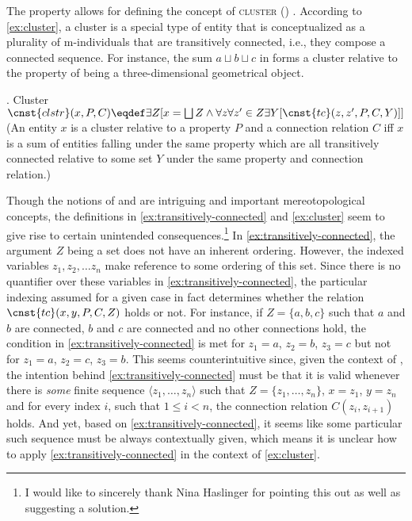 The property  allows for defining the concept of \textsc{cluster} () \citep[see][p. 144]{grimm2012degrees,grimm2012number}. According to \ref{ex:cluster}, a cluster is a special type of entity that is conceptualized as a plurality of m-individuals that are transitively connected, i.e., they compose a connected sequence. For instance, the sum $a\sqcup b\sqcup c$ in  forms a cluster relative to the property of being a three-dimensional geometrical object.

	\ex. Cluster \citep[p. 144; adapted]{grimm2012number}\\
	$\cnst{clstr}(x,P,C) \eqdef \exists Z[x = \bigsqcup Z \wedge \forall z \forall z' \in Z \exists Y[\cnst{tc}(z,z',P,C,Y)]]$\\
	(An entity $x$ is a cluster relative to a property $P$ and a connection relation $C$ iff $x$ is a sum of entities falling under the same property which are all transitively connected relative to some set $Y$ under the same property and connection relation.)\label{ex:cluster}

Though the notions of  and  are intriguing and important mereotopological concepts, the definitions in \ref{ex:transitively-connected} and \ref{ex:cluster} seem to give rise to certain unintended consequences.\footnote{I would like to sincerely thank Nina Haslinger for pointing this out as well as suggesting a solution.} In \ref{ex:transitively-connected}, the argument $Z$ being a set does not have an inherent ordering. However, the indexed variables $z_1,z_2,\dots z_n$ make reference to some ordering of this set. Since there is no quantifier over these variables in \ref{ex:transitively-connected}, the particular indexing assumed for a given case in fact determines whether the relation $\cnst{tc}(x,y,P,C,Z)$ holds or not. For instance, if $Z = \{a,b,c\}$ such that $a$ and $b$ are connected, $b$ and $c$ are connected and no other connections hold, the condition in \ref{ex:transitively-connected} is met for $z_1 = a$, $z_2 = b$, $z_3 = c$ but not for $z_1 = a$, $z_2 = c$, $z_3 = b$. This seems counterintuitive since, given the context of \citet{grimm2012degrees,grimm2012number}, the intention behind \ref{ex:transitively-connected} must be that it is valid whenever there is \textit{some} finite sequence $\langle z_1, \dots, z_n\rangle$ such that $Z = \{z_1, \dots, z_n\}$, $x=z_1$, $y=z_n$ and for every index $i$, such that $1 \leq i < n$, the connection relation $C(z_i, z_{i+1})$ holds. And yet, based on \ref{ex:transitively-connected}, it seems like some particular such sequence must be always contextually given, which means it is unclear how to apply \ref{ex:transitively-connected} in the context of \ref{ex:cluster}.


